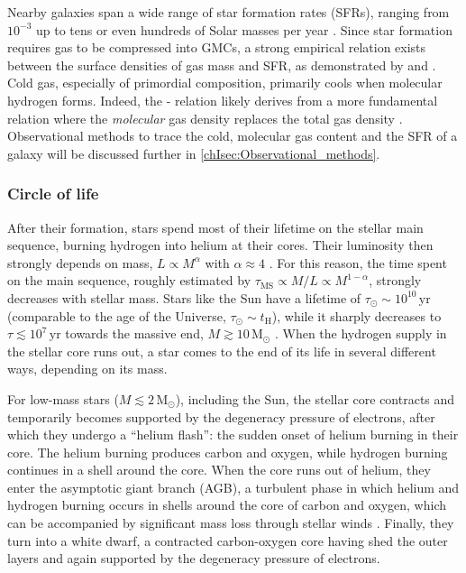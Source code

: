 Nearby galaxies span a wide range of star formation rates (SFRs), ranging from $10^{-3}$ up to tens or even hundreds of Solar masses per year \citep{2012ARA&A..50..531K}. Since star formation requires gas to be compressed into GMCs, a strong empirical relation exists between the surface densities of gas mass and SFR, as demonstrated by \citet{1959ApJ...129..243S} and \citet{1989ApJ...344..685K, 1998ApJ...498..541K}. Cold gas, especially of primordial composition, primarily cools when molecular hydrogen forms. Indeed, the \citeauthor{1959ApJ...129..243S}-\citeauthor{1989ApJ...344..685K} relation likely derives from a more fundamental relation where the \textit{molecular} gas density replaces the total gas density \citep[e.g.][]{2022MNRAS.510.3622B}. Observational methods to trace the cold, molecular gas content and the SFR of a galaxy will be discussed further in \cref{chIsec:Observational_methods}.

\subsubsection{Circle of life}
\label{chIsssec:Circle_of_life}

After their formation, stars spend most of their lifetime on the stellar main sequence, burning hydrogen into helium at their cores. Their luminosity then strongly depends on mass, $L \propto M^\alpha$ with $\alpha \approx 4$ \citep[e.g.][]{1993A&AS..100..647B}. For this reason, the time spent on the main sequence, roughly estimated by $\tau_\text{MS} \propto M/L \propto M^{1-\alpha}$, strongly decreases with stellar mass. Stars like the Sun have a lifetime of $\tau_\odot \sim 10^{10} \, \mathrm{yr}$ (comparable to the age of the Universe, $\tau_\odot \sim t_\text{H}$), while it sharply decreases to $\tau \lesssim 10^7 \, \mathrm{yr}$ towards the massive end, $M \gtrsim 10 \, \mathrm{M_\odot}$ \citep{1992A&AS...96..269S}. When the hydrogen supply in the stellar core runs out, a star comes to the end of its life in several different ways, depending on its mass.

For low-mass stars ($M \lesssim 2 \, \mathrm{M_\odot}$), including the Sun, the stellar core contracts and temporarily becomes supported by the degeneracy pressure of electrons, after which they undergo a ``helium flash'': the sudden onset of helium burning in their core. The helium burning produces carbon and oxygen, while hydrogen burning continues in a shell around the core. When the core runs out of helium, they enter the asymptotic giant branch (AGB), a turbulent phase in which helium and hydrogen burning occurs in shells around the core of carbon and oxygen, which can be accompanied by significant mass loss through stellar winds \citep{2010gfe..book.....M}. Finally, they turn into a white dwarf, a contracted carbon-oxygen core having shed the outer layers and again supported by the degeneracy pressure of electrons.

